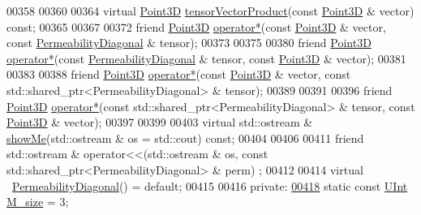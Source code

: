 \begin{DoxyCode}
00358 
00360 
00364     \textcolor{keyword}{virtual} \hyperlink{classFVCode3D_1_1Point3D}{Point3D} \hyperlink{classFVCode3D_1_1PermeabilityBase_a1c77d0168dd4ee2e3a1ce922e0c1725c}{tensorVectorProduct}(\textcolor{keyword}{const} \hyperlink{classFVCode3D_1_1Point3D}{Point3D} & vector) \textcolor{keyword}{const};
00365 
00367 
00372     \textcolor{keyword}{friend} \hyperlink{classFVCode3D_1_1Point3D}{Point3D} \hyperlink{classFVCode3D_1_1PermeabilityBase_a04284b595d50559389f6098e76611b76}{operator*}(\textcolor{keyword}{const} \hyperlink{classFVCode3D_1_1Point3D}{Point3D} & vector, \textcolor{keyword}{const} 
      \hyperlink{classFVCode3D_1_1PermeabilityDiagonal}{PermeabilityDiagonal} & tensor);
00373 
00375 
00380     \textcolor{keyword}{friend} \hyperlink{classFVCode3D_1_1Point3D}{Point3D} \hyperlink{classFVCode3D_1_1PermeabilityBase_a04284b595d50559389f6098e76611b76}{operator*}(\textcolor{keyword}{const} \hyperlink{classFVCode3D_1_1PermeabilityDiagonal}{PermeabilityDiagonal} & tensor, \textcolor{keyword}{const}
       \hyperlink{classFVCode3D_1_1Point3D}{Point3D} & vector);
00381 
00383 
00388     \textcolor{keyword}{friend} \hyperlink{classFVCode3D_1_1Point3D}{Point3D} \hyperlink{classFVCode3D_1_1PermeabilityBase_a04284b595d50559389f6098e76611b76}{operator*}(\textcolor{keyword}{const} \hyperlink{classFVCode3D_1_1Point3D}{Point3D} & vector, \textcolor{keyword}{const} 
      std::shared\_ptr<PermeabilityDiagonal> & tensor);
00389 
00391 
00396     \textcolor{keyword}{friend} \hyperlink{classFVCode3D_1_1Point3D}{Point3D} \hyperlink{classFVCode3D_1_1PermeabilityBase_a04284b595d50559389f6098e76611b76}{operator*}(\textcolor{keyword}{const} std::shared\_ptr<PermeabilityDiagonal> & tensor, \textcolor{keyword}{const} 
      \hyperlink{classFVCode3D_1_1Point3D}{Point3D} & vector);
00397 
00399 
00403     \textcolor{keyword}{virtual} std::ostream & \hyperlink{classFVCode3D_1_1PermeabilityBase_a4f06952af19c0100b6b6043fa1f8f97a}{showMe}(std::ostream & os = std::cout) \textcolor{keyword}{const};
00404 
00406 
00411     \textcolor{keyword}{friend} std::ostream & operator<<(std::ostream & os, const std::shared\_ptr<PermeabilityDiagonal> & perm)
      ;
00412 
00414     \textcolor{keyword}{virtual} ~\hyperlink{classFVCode3D_1_1PermeabilityDiagonal}{PermeabilityDiagonal}() = \textcolor{keywordflow}{default};
00415 
00416 \textcolor{keyword}{private}:
\hypertarget{Permeability_8hpp_source.tex_l00418}{}\hyperlink{classFVCode3D_1_1PermeabilityDiagonal_a24f8f212517aec83cf08bf236a6b7444}{00418}     \textcolor{keyword}{static} \textcolor{keyword}{const} \hyperlink{namespaceFVCode3D_a4bf7e328c75d0fd504050d040ebe9eda}{UInt} \hyperlink{classFVCode3D_1_1PermeabilityBase_a5914ac070cdad89b5b6f0133a0ee3ba5}{M\_size} = 3;

\end{DoxyCode}

